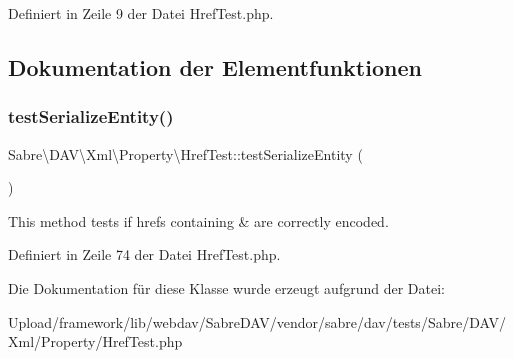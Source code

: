 Definiert in Zeile 9 der Datei Href\+Test.\+php.



\subsection{Dokumentation der Elementfunktionen}
\mbox{\label{class_sabre_1_1_d_a_v_1_1_xml_1_1_property_1_1_href_test_a5925d9f3a9fb6e4efcd872fe283ceb9f}} 
\subsubsection{\texorpdfstring{test\+Serialize\+Entity()}{testSerializeEntity()}}
{\footnotesize\ttfamily Sabre\textbackslash{}\+D\+A\+V\textbackslash{}\+Xml\textbackslash{}\+Property\textbackslash{}\+Href\+Test\+::test\+Serialize\+Entity (\begin{DoxyParamCaption}{ }\end{DoxyParamCaption})}

This method tests if hrefs containing \& are correctly encoded. 

Definiert in Zeile 74 der Datei Href\+Test.\+php.



Die Dokumentation für diese Klasse wurde erzeugt aufgrund der Datei\+:\begin{DoxyCompactItemize}
\item 
Upload/framework/lib/webdav/\+Sabre\+D\+A\+V/vendor/sabre/dav/tests/\+Sabre/\+D\+A\+V/\+Xml/\+Property/Href\+Test.\+php\end{DoxyCompactItemize}
